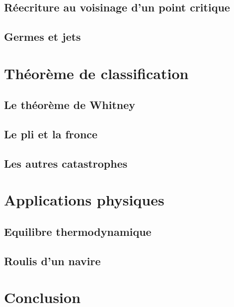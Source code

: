\documentclass{beamer}
\begin{document}
\subsection{Réecriture au voisinage d'un point critique}
\subsection{Germes et jets}

\section{Théorème de classification}
\subsection{Le théorème de Whitney}
\subsection{Le pli et la fronce}
\subsection{Les autres catastrophes}

\section{Applications physiques}
\subsection{Equilibre thermodynamique}
\subsection{Roulis d'un navire}

\section*{Conclusion}
\frame{}
\end{document}
